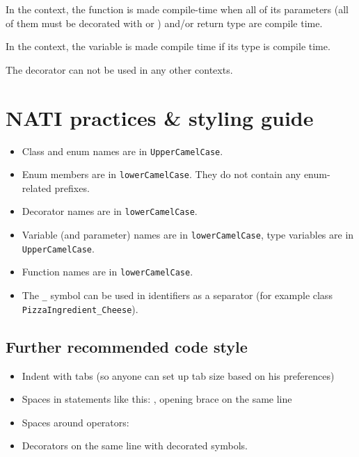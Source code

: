 In the  context, the function is made compile-time when all of its parameters (all of them must be decorated with  or ) and/or return type are compile time.

In the  context, the variable is made compile time if its type is compile time.

The decorator can not be used in any other contexts.

\chapter{NATI practices \& styling guide}

\begin{itemize}
	\item Class and enum names are in \verb|UpperCamelCase|.
	\item Enum members are in \verb|lowerCamelCase|. They do not contain any enum-related prefixes.
	\item Decorator names are in \verb|lowerCamelCase|.
	\item Variable (and parameter) names are in \verb|lowerCamelCase|, type variables are in \verb|UpperCamelCase|.
	\item Function names are in \verb|lowerCamelCase|.
	\item The \verb|_| symbol can be used in identifiers as a separator (for example class \verb|PizzaIngredient_Cheese|).
\end{itemize}

\section{Further recommended code style}
\begin{itemize}
	\item Indent with tabs (so anyone can set up tab size based on his preferences)
	\item Spaces in statements like this: , opening brace on the same line
	\item Spaces around operators: 
	\item Decorators on the same line with decorated symbols.
\end{itemize}

